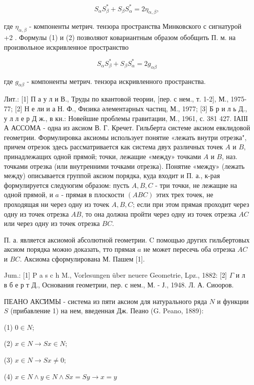 \documentclass[10pt]{article}
\begin{document}
\[
S_{\alpha} S_{\beta}^{*}+S_{\beta} S_{\alpha}^{*}=2 \eta_{\alpha, \beta},
\]

где $\eta_{\alpha, \beta}$ - компоненты метрич. тензора пространства Минковского с сигнатурой +2 . Формулы (1) и (2) позволяют ковариантным образом обобщить П. м. на произвольное искривленное пространство

\[
S_{\alpha} S_{\beta}^{*}+S_{\beta} S_{\alpha}^{*}=2 g_{\alpha \beta}
\]

где $g_{\alpha \beta}$ - компоненты метрич. тензора искривленного пространства.

Лит.: [1] П а у л и В., Труды по квантовой теории, [пер. с нем., т. 1-2], М., 1975-77; [2] Н е ли и а Н. Ф., Физика
әлементарных частиц, М., 1977; [3] Б р и л ь Д., у л л е р Д ж., в кн.: Новейшие проблемы гравитации, М., 1961, с. 381 427. ІАІІІ А АССОМА - одна из аксиом В. Г. Кречет. Гильберта системе аксиом евклидовой геометрии. Формулировка аксиомы использует понятие «лежать внутри отрезка", причем отрезок здесь рассматривается как система двух различных точек $A$ и $B$, принадлежащих одной прямой; точки, лежащие «между» точками $A$ и $B$, наз. точками отрезка (или внутренними точками отрезка). Понятие «между» (лежать между) описывается группой аксиом порядка, куда входит и П. а., к-рая формулируется следуюгим образом: пусть $A, B, C$ - три точки, не лежащие на одной прямой, и $a$ - прямая в плоскости $(A B C)$ этих трех точек, не проходящая ни через одну из точек $A, B, C$; если при этом прямая проходит через одну из точек отрезка $A B$, то она должна пройти через одну из точек отрезка $A C$ или через одну из точек отрезка $B C$.

П. а. является аксиомой абсолютной геометрии. $\mathrm{C}$ помощью других гильбертовых аксиом порядка можно доказать, тто прямая $a$ не может пересечь оба отрезка $A C$ и $B C$. Аксиома сформулирована М. Пашем [1].

Jum.: [1] P a s c h M., Vorlesungen über neuere Geometrie, Lpz., 1882: [2] $\Gamma$ и л в б е р т Д., Основания геометрии, пер.
с нем., М. - Ј., 1948.
Л. А. Сиооров.

ПЕАНО АКС̆ИМЫ - система из пяти аксиом для натурального ряда $N$ и функции $S$ (прибавление 1) на нем, введенная Дж. Пеано (G. Peano, 1889):

(1) $0 \in N$;

(2) $x \in N \rightarrow S x \in N$;

(3) $x \in N \longrightarrow S x \neq 0$;

(4) $x \in N \wedge y \in N \wedge S x=S y \longrightarrow x=y$
\end{document}
